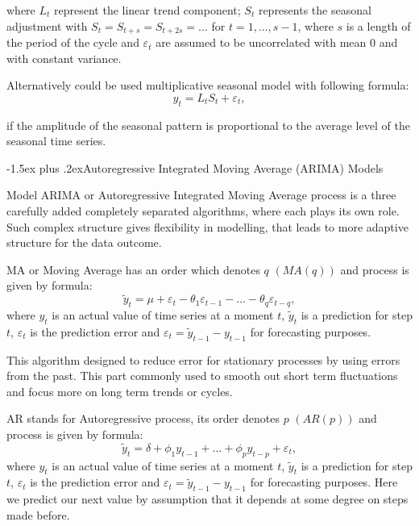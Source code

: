 \documentclass[12pt,a4paper]{article}
\makeatletter
\renewcommand{\subsection}{\@startsection{subsection}{2}{18pt}{3.25ex plus 1ex minus 0.2ex}%
{-1.5ex plus .2ex}{\bfseries\rmfamily\large}}
\theoremstyle{myplain}
\numberwithin{equation}{section}
\makeatother
\begin{document}
where $L_t$ represent the linear trend component; $S_t$ represents the seasonal adjustment with $S_t = S_{t+s} = S_{t+2s} = \dots$ for $t = 1, \dots , s-1$, where $s$ is a length of the period of the cycle and $\varepsilon_t$ are assumed
to be uncorrelated with mean 0 and with constant variance\cite{MainBook}.

Alternatively could be used multiplicative seasonal model with following formula:
\begin{equation}
y_t = L_t S_t + \varepsilon_t,
\end{equation}

if the amplitude of the seasonal pattern is proportional to the average level of the seasonal time series.

\subsection{Autoregressive Integrated Moving Average (ARIMA) Models}

Model ARIMA or Autoregressive Integrated Moving Average process is a three carefully added completely separated algorithms, where each plays its own role. Such complex structure gives flexibility in modelling, that leads to more adaptive structure for the data outcome.

MA or Moving Average has an order which denotes $ q $ $ (MA(q)) $ and process is given by formula:
\begin{equation}
\tilde{y}_t = \mu + \varepsilon_t - \theta_1 \varepsilon_{t - 1} - \dots - \theta_q \varepsilon_{t - q},
\end{equation}
where $ y_t $ is an actual value of time series at a moment $ t $, $ \tilde{y}_t $ is a prediction for step $ t $, $ \varepsilon_t $ is the prediction error and $ \varepsilon_t = \tilde{y}_{t - 1} - y_{t - 1} $ for forecasting purposes. 

This algorithm designed to reduce error for stationary processes by using errors from the past. This part commonly used to smooth out short term fluctuations and focus more on long term trends or cycles.

AR stands for Autoregressive process, its order denotes $ p $ $ (AR(p)) $ and process is given by formula:
\begin{equation}
\tilde{y}_t = \delta + \phi_1 y_{t - 1} + \dots + \phi_p y_{t - p} + \varepsilon_t,
\end{equation}
where $ y_t $ is an actual value of time series at a moment $ t $, $ \tilde{y}_t $ is a prediction for step $ t $, $ \varepsilon_t $ is the prediction error and $ \varepsilon_t = \tilde{y}_{t - 1} - y_{t - 1} $ for forecasting purposes. Here we predict our next value by assumption that it depends at some degree on steps made before.
\end{document}
